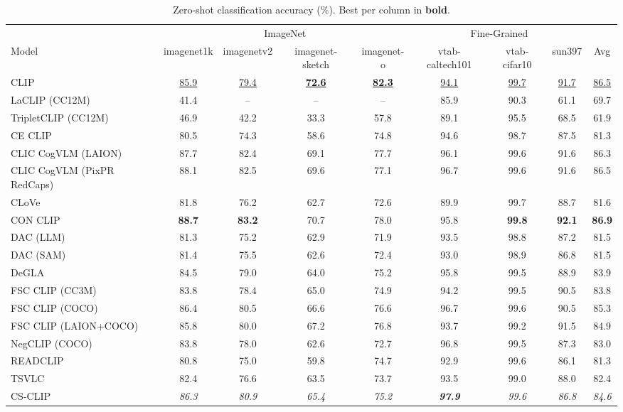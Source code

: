 \begin{table}[t]
  \centering
  \scriptsize
  \caption{Zero-shot classification accuracy (\%). Best per column in \textbf{bold}.}
  \label{tab:downstream_zs}
  \begin{adjustbox}{max width=\textwidth}
  \setlength{\tabcolsep}{3pt}
  \begin{tabular}{lcccccccc}
    \toprule
     & \multicolumn{4}{c}{ImageNet} & \multicolumn{3}{c}{Fine-Grained} &  \\
    \cmidrule(lr){2-5} \cmidrule(lr){6-8}
    Model & imagenet1k & imagenetv2 & imagenet-sketch & imagenet-o & vtab-caltech101 & vtab-cifar10 & sun397 & Avg \\
    \midrule
    CLIP & \underline{85.9} & \underline{79.4} & \underline{\textbf{72.6}} & \underline{\textbf{82.3}} & \underline{94.1} & \underline{99.7} & \underline{91.7} & \underline{86.5} \\
    \midrule
    LaCLIP (CC12M) & 41.4 & -- & -- & -- & 85.9 & 90.3 & 61.1 & 69.7 \\
    TripletCLIP (CC12M) & 46.9 & 42.2 & 33.3 & 57.8 & 89.1 & 95.5 & 68.5 & 61.9 \\
    \midrule
    CE CLIP & 80.5 & 74.3 & 58.6 & 74.8 & 94.6 & 98.7 & 87.5 & 81.3 \\
    CLIC CogVLM (LAION) & 87.7 & 82.4 & 69.1 & 77.7 & 96.1 & 99.6 & 91.6 & 86.3 \\
    CLIC CogVLM (PixPR RedCaps) & 88.1 & 82.5 & 69.6 & 77.1 & 96.7 & 99.6 & 91.6 & 86.5 \\
    CLoVe & 81.8 & 76.2 & 62.7 & 72.6 & 89.9 & 99.7 & 88.7 & 81.6 \\
    CON CLIP & \textbf{88.7} & \textbf{83.2} & 70.7 & 78.0 & 95.8 & \textbf{99.8} & \textbf{92.1} & \textbf{86.9} \\
    DAC (LLM) & 81.3 & 75.2 & 62.9 & 71.9 & 93.5 & 98.8 & 87.2 & 81.5 \\
    DAC (SAM) & 81.4 & 75.5 & 62.6 & 72.4 & 93.0 & 98.9 & 86.8 & 81.5 \\
    DeGLA & 84.5 & 79.0 & 64.0 & 75.2 & 95.8 & 99.5 & 88.9 & 83.9 \\
    FSC CLIP (CC3M) & 83.8 & 78.4 & 65.0 & 74.9 & 94.2 & 99.5 & 90.5 & 83.8 \\
    FSC CLIP (COCO) & 86.4 & 80.5 & 66.6 & 76.6 & 96.7 & 99.6 & 90.5 & 85.3 \\
    FSC CLIP (LAION+COCO) & 85.8 & 80.0 & 67.2 & 76.8 & 93.7 & 99.2 & 91.5 & 84.9 \\
    NegCLIP (COCO) & 83.8 & 78.0 & 62.6 & 72.7 & 96.8 & 99.5 & 87.3 & 83.0 \\
    READCLIP & 80.8 & 75.0 & 59.8 & 74.7 & 92.9 & 99.6 & 86.1 & 81.3 \\
    TSVLC & 82.4 & 76.6 & 63.5 & 73.7 & 93.5 & 99.0 & 88.0 & 82.4 \\
    \midrule
    CS-CLIP & \emph{86.3} & \emph{80.9} & \emph{65.4} & \emph{75.2} & \emph{\textbf{97.9}} & \emph{99.6} & \emph{86.8} & \emph{84.6} \\
    \bottomrule
  \end{tabular}
  \end{adjustbox}
\end{table}